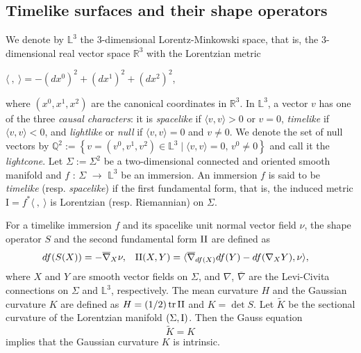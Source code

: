 \documentclass[11pt,reqno]{amsart}
\theoremstyle{plain} %
\theoremstyle{definition}
\DeclareMathOperator{\tr}{tr}
\begin{document}
\subsection{Timelike surfaces and their shape operators\label{preliminary1}}
 We denote by $\mathbb{L}^3$ the 3-dimensional Lorentz-Minkowski space, that is, the 3-dimensional real vector space $\mathbb{R}^3$ with the Lorentzian metric \begin{center}
$\langle \ ,\ \rangle =-(dx^0)^2+(dx^1)^2+(dx^2)^2$,
\end{center}
where $(x^0, x^1, x^2)$ are the canonical coordinates in $\mathbb{R}^3$. In $\mathbb{L}^3$, a vector $v$ has one of the three {\it causal characters}: it is {\it spacelike} if $\langle v, v \rangle > 0$ or $v=0$, {\it timelike} if  $\langle v, v \rangle < 0$, and {\it lightlike} or {\it null} if $\langle v, v \rangle = 0$ and $v\neq 0$.  We denote the set of null vectors by $\mathbb{Q}^2:= \left\{v=(v^0, v^1, v^2)\in \mathbb{L}^3\mid \langle v,v \rangle=0,\, v^0\neq0\right\}$ and call it the {\it lightcone}. Let $\Sigma :=\Sigma ^2$ be a two-dimensional connected and oriented smooth manifold and $f$ : $\Sigma $ $\longrightarrow$ $\mathbb{L}^3$ be an immersion.   An immersion $f$ is said to be {\it timelike} (resp. {\it spacelike}) if the first fundamental form, that is, the induced metric $\mathrm{I}=f^*\langle \ ,\  \rangle$ is Lorentzian (resp. Riemannian) on $\Sigma$.

 For a timelike immersion $f$ and its spacelike unit normal vector field $\nu$, the shape operator $S$ and the second fundamental form ${\rm II}$ are defined as\begin{align}
 df(S(X))=-\overline{\nabla}_{X} \nu,\quad & {\rm II}(X,Y)=\langle \overline{\nabla}_{df(X)}df(Y)-df(\nabla_{X}Y), \nu \rangle,\nonumber 
\end{align}
where $X$ and $Y$ are smooth vector fields on $\Sigma $, and $\nabla$, $\overline{\nabla}$ are the Levi-Civita connections on $\Sigma$ and $\mathbb{L}^3$, respectively.  The mean curvature $H$ and the Gaussian curvature $K$ are defined as $H=(1/2)\tr{{\rm II}}$ and $K=\det S$. Let $\tilde{K}$ be the sectional curvature of the Lorentzian manifold $(\Sigma, \rm{I})$. Then the Gauss equation 
\begin{equation*}
\tilde{K}=K
\end{equation*}
implies that the Gaussian curvature $K$ is intrinsic.
\end{document}
